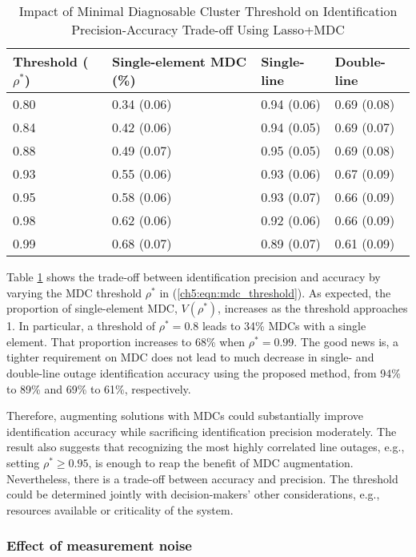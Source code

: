 \begin{table}[!t]
\caption{Impact of Minimal Diagnosable Cluster Threshold on Identification Precision-Accuracy Trade-off Using Lasso+MDC}
\label{ch5:tab:impact_mdc_threshold}
\centering
\begin{tabular}{llll}
\hline
\hline
Threshold ($\rho^*$)  & Single-element MDC (\%) & Single-line & Double-line \\
\hline
0.80 & 0.34 (0.06) & 0.94 (0.06) & 0.69 (0.08) \\
0.84 & 0.42 (0.06) & 0.94 (0.05) & 0.69 (0.07) \\
0.88 & 0.49 (0.07) & 0.95 (0.05) & 0.69 (0.08) \\
0.93 & 0.55 (0.06) & 0.93 (0.06) & 0.67 (0.09) \\
0.95 & 0.58 (0.06) & 0.93 (0.07) & 0.66 (0.09) \\
0.98 & 0.62 (0.06) & 0.92 (0.06) & 0.66 (0.09) \\
0.99 & 0.68 (0.07) & 0.89 (0.07) & 0.61 (0.09) \\
\hline 
\end{tabular}
\end{table}
Table \ref{ch5:tab:impact_mdc_threshold} shows the trade-off between identification precision and accuracy by varying the MDC threshold $\rho^*$ in (\ref{ch5:eqn:mdc_threshold}). As expected, the proportion of single-element MDC, $V(\rho^*)$, increases as the threshold approaches 1. In particular, a threshold of $\rho^* = 0.8$ leads to 34\% MDCs with a single element. That proportion increases to 68\% when $\rho^* = 0.99$. The good news is, a tighter requirement on MDC does not lead to much decrease in single- and double-line outage identification accuracy using the proposed method, from 94\% to 89\% and 69\% to 61\%, respectively. 

Therefore, augmenting solutions with MDCs could substantially improve identification accuracy while sacrificing identification precision moderately. The result also suggests that recognizing the most highly correlated line outages, e.g., setting $\rho^* \ge 0.95$, is enough to reap the benefit of MDC augmentation. Nevertheless, there is a trade-off between accuracy and precision. The threshold could be determined jointly with decision-makers' other considerations, e.g., resources available or criticality of the system. 

\subsubsection{Effect of measurement noise} 

